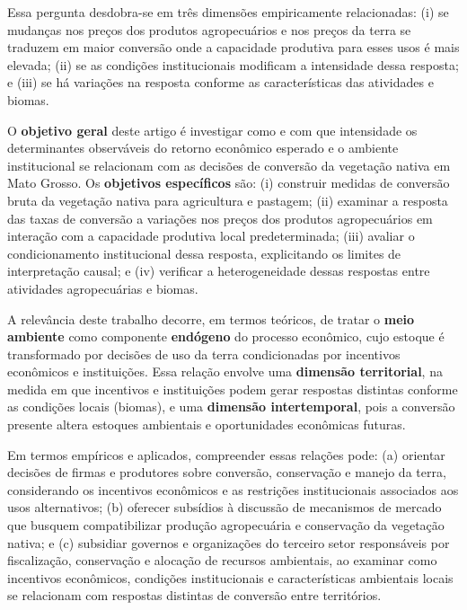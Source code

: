 Essa pergunta desdobra-se em três dimensões empiricamente relacionadas: (i) se mudanças nos preços dos produtos agropecuários e nos preços da terra se traduzem em maior conversão onde a capacidade produtiva para esses usos é mais elevada; (ii) se as condições institucionais modificam a intensidade dessa resposta; e (iii) se há variações na resposta conforme as características das atividades e biomas.

O \textbf{objetivo geral} deste artigo é investigar como e com que intensidade os determinantes observáveis do retorno econômico esperado e o ambiente institucional se relacionam com as decisões de conversão da vegetação nativa em Mato Grosso. Os \textbf{objetivos específicos} são: (i) construir medidas de conversão bruta da vegetação nativa para agricultura e pastagem; (ii) examinar a resposta das taxas de conversão a variações nos preços dos produtos agropecuários em interação com a capacidade produtiva local predeterminada; (iii) avaliar o condicionamento institucional dessa resposta, explicitando os limites de interpretação causal; e (iv) verificar a heterogeneidade dessas respostas entre atividades agropecuárias e biomas.

A relevância deste trabalho decorre, em termos teóricos, de tratar o \textbf{meio ambiente} como componente \textbf{endógeno} do processo econômico, cujo estoque é transformado por decisões de uso da terra condicionadas por incentivos econômicos e instituições. Essa relação envolve uma \textbf{dimensão territorial}, na medida em que incentivos e instituições podem gerar respostas distintas conforme as condições locais (biomas), e uma \textbf{dimensão intertemporal}, pois a conversão presente altera estoques ambientais e oportunidades econômicas futuras.

Em termos empíricos e aplicados, compreender essas relações pode: (a) orientar decisões de firmas e produtores sobre conversão, conservação e manejo da terra, considerando os incentivos econômicos e as restrições institucionais associados aos usos alternativos; (b) oferecer subsídios à discussão de mecanismos de mercado que busquem compatibilizar produção agropecuária e conservação da vegetação nativa; e (c) subsidiar governos e organizações do terceiro setor responsáveis por fiscalização, conservação e alocação de recursos ambientais, ao examinar como incentivos econômicos, condições institucionais e características ambientais locais se relacionam com respostas distintas de conversão entre territórios.

